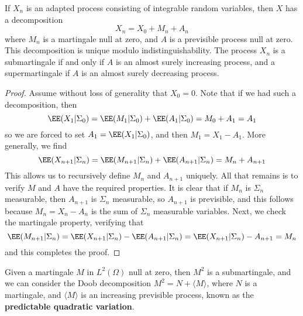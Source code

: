 \begin{theorem}
    If $X_n$ is an adapted process consisting of integrable random variables, then $X$ has a decomposition
    \[ X_n = X_0 + M_n + A_n \]
    where $M_n$ is a martingale null at zero, and $A$ is a previsible process null at zero. This decomposition is unique modulo indistinguishability. The process $X_n$ is a submartingale if and only if $A$ is an almost surely increasing process, and a supermartingale if $A$ is an almost surely decreasing process.
\end{theorem}
\begin{proof}
    Assume without loss of generality that $X_0 = 0$. Note that if we had such a decomposition, then
    \[ \EE(X_1|\Sigma_0) = \EE(M_1|\Sigma_0) + \EE(A_1|\Sigma_0) = M_0 + A_1 = A_1 \]
    so we are forced to set $A_1 = \EE(X_1|\Sigma_0)$, and then $M_1 = X_1 - A_1$. More generally, we find
    \[ \EE(X_{n+1}|\Sigma_n) = \EE(M_{n+1}|\Sigma_n) + \EE(A_{n+1}|\Sigma_n) = M_n + A_{n+1} \]
    This allows us to recursively define $M_n$ and $A_{n+1}$ uniquely. All that remains is to verify $M$ and $A$ have the required properties. It is clear that if $M_n$ is $\Sigma_n$ measurable, then $A_{n+1}$ is $\Sigma_n$ measurable, so $A_{n+1}$ is previsible, and this follows because $M_n = X_n - A_n$ is the sum of $\Sigma_n$ measurable variables. Next, we check the martingale property, verifying that
    \[ \EE(M_{n+1}|\Sigma_n) = \EE(X_{n+1}|\Sigma_n) - \EE(A_{n+1}|\Sigma_n) = \EE(X_{n+1}|\Sigma_n) - A_{n+1} = M_n \]
    and this completes the proof.
\end{proof}

Given a martingale $M$ in $L^2(\Omega)$ null at zero, then $M^2$ is a submartingale, and we can consider the Doob decomposition $M^2 = N + \langle M \rangle$, where $N$ is a martingale, and $\langle M \rangle$ is an increasing previsible process, known as the {\bf predictable quadratic variation}.

